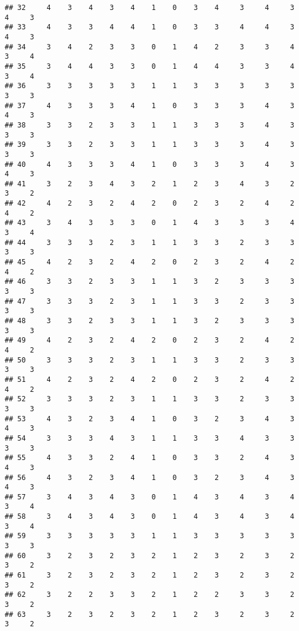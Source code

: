\documentclass[
]{article}
\begin{document}
\begin{verbatim}
## 32     4    3    4    3    4    1    0    3    4     3     4     3     4     3
## 33     4    3    3    4    4    1    0    3    3     4     4     3     4     3
## 34     3    4    2    3    3    0    1    4    2     3     3     4     3     4
## 35     3    4    4    3    3    0    1    4    4     3     3     4     3     4
## 36     3    3    3    3    3    1    1    3    3     3     3     3     3     3
## 37     4    3    3    3    4    1    0    3    3     3     4     3     4     3
## 38     3    3    2    3    3    1    1    3    3     3     4     3     3     3
## 39     3    3    2    3    3    1    1    3    3     3     4     3     3     3
## 40     4    3    3    3    4    1    0    3    3     3     4     3     4     3
## 41     3    2    3    4    3    2    1    2    3     4     3     2     3     2
## 42     4    2    3    2    4    2    0    2    3     2     4     2     4     2
## 43     3    4    3    3    3    0    1    4    3     3     3     4     3     4
## 44     3    3    3    2    3    1    1    3    3     2     3     3     3     3
## 45     4    2    3    2    4    2    0    2    3     2     4     2     4     2
## 46     3    3    2    3    3    1    1    3    2     3     3     3     3     3
## 47     3    3    3    2    3    1    1    3    3     2     3     3     3     3
## 48     3    3    2    3    3    1    1    3    2     3     3     3     3     3
## 49     4    2    3    2    4    2    0    2    3     2     4     2     4     2
## 50     3    3    3    2    3    1    1    3    3     2     3     3     3     3
## 51     4    2    3    2    4    2    0    2    3     2     4     2     4     2
## 52     3    3    3    2    3    1    1    3    3     2     3     3     3     3
## 53     4    3    2    3    4    1    0    3    2     3     4     3     4     3
## 54     3    3    3    4    3    1    1    3    3     4     3     3     3     3
## 55     4    3    3    2    4    1    0    3    3     2     4     3     4     3
## 56     4    3    2    3    4    1    0    3    2     3     4     3     4     3
## 57     3    4    3    4    3    0    1    4    3     4     3     4     3     4
## 58     3    4    3    4    3    0    1    4    3     4     3     4     3     4
## 59     3    3    3    3    3    1    1    3    3     3     3     3     3     3
## 60     3    2    3    2    3    2    1    2    3     2     3     2     3     2
## 61     3    2    3    2    3    2    1    2    3     2     3     2     3     2
## 62     3    2    2    3    3    2    1    2    2     3     3     2     3     2
## 63     3    2    3    2    3    2    1    2    3     2     3     2     3     2

\end{verbatim}
\end{document}
